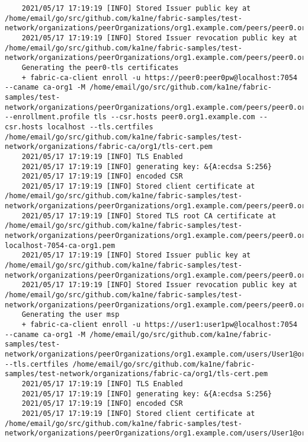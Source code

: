 \begin{lstlisting}
    2021/05/17 17:19:19 [INFO] Stored Issuer public key at /home/email/go/src/github.com/ka1ne/fabric-samples/test-network/organizations/peerOrganizations/org1.example.com/peers/peer0.org1.example.com/msp/IssuerPublicKey
    2021/05/17 17:19:19 [INFO] Stored Issuer revocation public key at /home/email/go/src/github.com/ka1ne/fabric-samples/test-network/organizations/peerOrganizations/org1.example.com/peers/peer0.org1.example.com/msp/IssuerRevocationPublicKey
    Generating the peer0-tls certificates
    + fabric-ca-client enroll -u https://peer0:peer0pw@localhost:7054 --caname ca-org1 -M /home/email/go/src/github.com/ka1ne/fabric-samples/test-network/organizations/peerOrganizations/org1.example.com/peers/peer0.org1.example.com/tls --enrollment.profile tls --csr.hosts peer0.org1.example.com --csr.hosts localhost --tls.certfiles /home/email/go/src/github.com/ka1ne/fabric-samples/test-network/organizations/fabric-ca/org1/tls-cert.pem
    2021/05/17 17:19:19 [INFO] TLS Enabled
    2021/05/17 17:19:19 [INFO] generating key: &{A:ecdsa S:256}
    2021/05/17 17:19:19 [INFO] encoded CSR
    2021/05/17 17:19:19 [INFO] Stored client certificate at /home/email/go/src/github.com/ka1ne/fabric-samples/test-network/organizations/peerOrganizations/org1.example.com/peers/peer0.org1.example.com/tls/signcerts/cert.pem
    2021/05/17 17:19:19 [INFO] Stored TLS root CA certificate at /home/email/go/src/github.com/ka1ne/fabric-samples/test-network/organizations/peerOrganizations/org1.example.com/peers/peer0.org1.example.com/tls/tlscacerts/tls-localhost-7054-ca-org1.pem
    2021/05/17 17:19:19 [INFO] Stored Issuer public key at /home/email/go/src/github.com/ka1ne/fabric-samples/test-network/organizations/peerOrganizations/org1.example.com/peers/peer0.org1.example.com/tls/IssuerPublicKey
    2021/05/17 17:19:19 [INFO] Stored Issuer revocation public key at /home/email/go/src/github.com/ka1ne/fabric-samples/test-network/organizations/peerOrganizations/org1.example.com/peers/peer0.org1.example.com/tls/IssuerRevocationPublicKey
    Generating the user msp
    + fabric-ca-client enroll -u https://user1:user1pw@localhost:7054 --caname ca-org1 -M /home/email/go/src/github.com/ka1ne/fabric-samples/test-network/organizations/peerOrganizations/org1.example.com/users/User1@org1.example.com/msp --tls.certfiles /home/email/go/src/github.com/ka1ne/fabric-samples/test-network/organizations/fabric-ca/org1/tls-cert.pem
    2021/05/17 17:19:19 [INFO] TLS Enabled
    2021/05/17 17:19:19 [INFO] generating key: &{A:ecdsa S:256}
    2021/05/17 17:19:19 [INFO] encoded CSR
    2021/05/17 17:19:19 [INFO] Stored client certificate at /home/email/go/src/github.com/ka1ne/fabric-samples/test-network/organizations/peerOrganizations/org1.example.com/users/User1@org1.example.com/msp/signcerts/cert.pem

\end{lstlisting}
